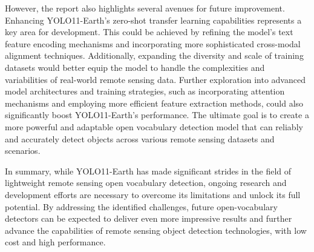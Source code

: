 \documentclass{article}
\begin{document}
However, the report also highlights several avenues for future improvement. Enhancing YOLO11-Earth's zero-shot 
transfer learning capabilities represents a key area for development. This could be achieved by refining 
the model's text feature encoding mechanisms and incorporating more sophisticated cross-modal alignment 
techniques. Additionally, expanding the diversity and scale of training datasets would better equip the model 
to handle the complexities and variabilities of real-world remote sensing data. Further exploration into 
advanced model architectures and training strategies, such as incorporating attention mechanisms and employing 
more efficient feature extraction methods, could also significantly boost YOLO11-Earth's performance. The 
ultimate goal is to create a more powerful and adaptable open vocabulary detection model that can reliably 
and accurately detect objects across various remote sensing datasets and scenarios.

In summary, while YOLO11-Earth has made significant strides in the field of lightweight remote sensing open 
vocabulary detection, ongoing research and development efforts are necessary to overcome its limitations and 
unlock its full potential. By addressing the identified challenges, future open-vocabulary detectors can be 
expected to deliver even more impressive results and further advance the capabilities of remote sensing object 
detection technologies, with low cost and high performance.

\end{document}
